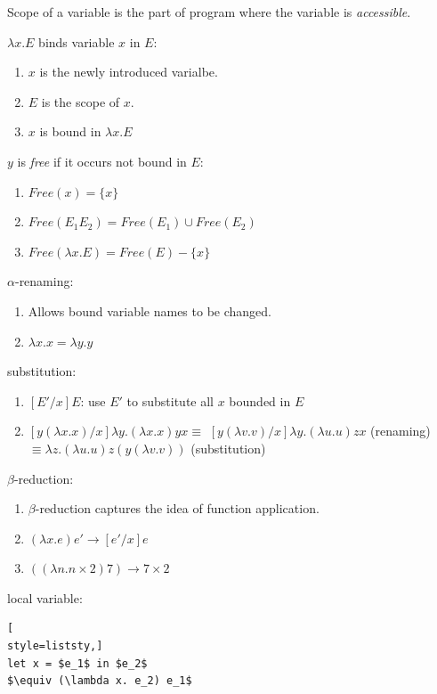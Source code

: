 Scope of a variable is the part of program where the variable is \textit{accessible}.

$\lambda x. E$ binds variable $x$ in $E$:
\begin{enumerate}
    \item $x$ is the newly introduced varialbe.
    \item $E$ is the scope of $x$.
    \item $x$ is bound in $\lambda x. E$
\end{enumerate}

$y$ is \textit{free} if it occurs not bound in $E$:
\begin{enumerate}
    \item $Free(x) = \{x\}$
    \item $Free(E_1 E_2) = Free(E_1) \cup Free(E_2)$ 
    \item $Free(\lambda x. E) = Free(E) - \{x\}$
\end{enumerate}

$\alpha$-renaming:
\begin{enumerate}
    \item Allows bound variable names to be changed.
    \item $\lambda x. x = \lambda y. y$
\end{enumerate}

substitution:
\begin{enumerate}
    \item $[E'/x]E$: use $E'$ to substitute all $x$ bounded in $E$
    \item $[y (\lambda x. x)/x] \lambda y. (\lambda x. x) y x
           \equiv$
           $[y (\lambda v. v)/x] \lambda y. (\lambda u. u) z x $ (renaming)
           $\equiv \lambda z. (\lambda u. u) z (y (\lambda v. v))$ (substitution) 
\end{enumerate}

$\beta$-reduction:
\begin{enumerate}
    \item $\beta$-reduction captures the idea of function application.
    \item $(\lambda x. e) e' \rightarrow [e'/x]e$
    \item $((\lambda n. n\times2) 7) \rightarrow 7\times 2$
\end{enumerate}

local variable:
\begin{lstlisting}[
style=liststy,] 
let x = $e_1$ in $e_2$
$\equiv (\lambda x. e_2) e_1$
\end{lstlisting}


